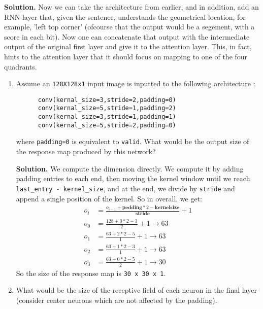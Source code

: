 \documentclass{article}
\begin{document}
\begin{enumerate}
\begin{enumerate}
        \textbf{Solution.} Now we can take the architecture from earlier, and in addition, add an RNN layer that, given the sentence, understands the geometrical location, for example, 'left top corner' (ofcourse that the output would be a segement, with a score in each bit). Now one can concatenate that output with the intermediate output of the original first layer and give it to the attention layer. This, in fact, hints to the attention layer that it should focus on mapping to one of the four quadrants.
    \end{enumerate}
    \begin{enumerate}
      \item Assume an \verb|128X128x1| input image is inputted to the following architecture :
\begin{verbatim}
      conv(kernal_size=3,stride=2,padding=0)
      conv(kernal_size=5,stride=1,padding=2)
      conv(kernal_size=3,stride=1,padding=1)
      conv(kernal_size=5,stride=2,padding=0)
\end{verbatim}
where \verb|padding=0| is equivalent to \verb|valid|. What would be the output size of the response map produced by this network?
        

\textbf{Solution.} We compute the dimension directly. We compute it by adding padding entries to each end, then moving the kernel window until we reach \verb|last_entry - kernel_size|, and at the end, we divide by \verb|stride| and append a single position of the kernel. So in overall, we get:
\begin{equation*}
  \begin{split}
    o_i &= \frac{ o_{i-1} + \mathbf{pedding} * 2 - \mathbf{kernel size} }{ \mathbf{stride} } +1 \\
      o_0 &=  \frac{  128 + 0 * 2 - 3}{2} + 1 \rightarrow 63  \\
      o_1 &=  \frac{ 63 + 2 * 2 - 5}{1} + 1 \rightarrow 63 \\
      o_2 &=  \frac{  63 + 1 * 2 - 3}{1} + 1\rightarrow 63 \\
      o_3 &=  \frac{  63 + 0 * 2 - 5}{2} + 1 \rightarrow 30 
    \end{split}
\end{equation*}
So the size of the response map is \verb|30 x 30 x 1|. 
\item What would be the size of the receptive field of each neuron in the final layer (consider center neurons which are not affected by the padding).


\end{enumerate}
\end{enumerate}
\end{document}
